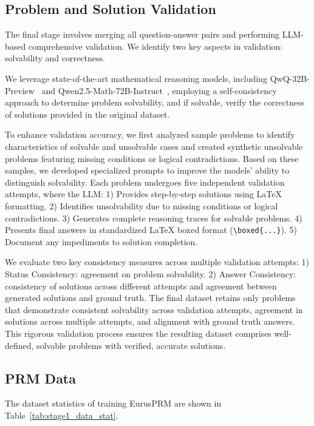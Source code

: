 \subsection{Problem and Solution Validation}

The final stage involves merging all question-answer pairs and performing LLM-based comprehensive validation. We identify two key aspects in validation: solvability and correctness.

We leverage state-of-the-art mathematical reasoning models, including QwQ-32B-Preview~\citep{qwq-32b-preview} and Qwen2.5-Math-72B-Instruct~\citep{yang2024qwen25mathtechnicalreportmathematical}, employing a self-consistency approach to determine problem solvability, and if solvable, verify the correctness of solutions provided in the original dataset.


To enhance validation accuracy, we first analyzed sample problems to identify characteristics of solvable and unsolvable cases and created synthetic unsolvable problems featuring missing conditions or logical contradictions. Based on these samples, we developed specialized prompts to improve the models' ability to distinguish solvability. Each problem undergoes five independent validation attempts, where the LLM: 1) Provides step-by-step solutions using LaTeX formatting. 2) Identifies unsolvability due to missing conditions or logical contradictions. 3) Generates complete reasoning traces for solvable problems. 4) Presents final answers in standardized LaTeX boxed format (\texttt{\textbackslash boxed\{...\}}). 5) Document any impediments to solution completion.



We evaluate two key consistency measures across multiple validation attempts: 1) Status Consistency: agreement on problem solvability. 2) Answer Consistency: consistency of solutions across different attempts and agreement between generated solutions and ground truth. The final dataset retains only problems that demonstrate consistent solvability across validation attempts, agreement in solutions across multiple attempts, and alignment with ground truth answers. This rigorous validation process ensures the resulting dataset comprises well-defined, solvable problems with verified, accurate solutions.



\subsection{PRM Data}
\label{sec:app_prm_data}

% 
The dataset statistics of training EurusPRM are shown in Table~\ref{tab:stage1_data_stat}.

